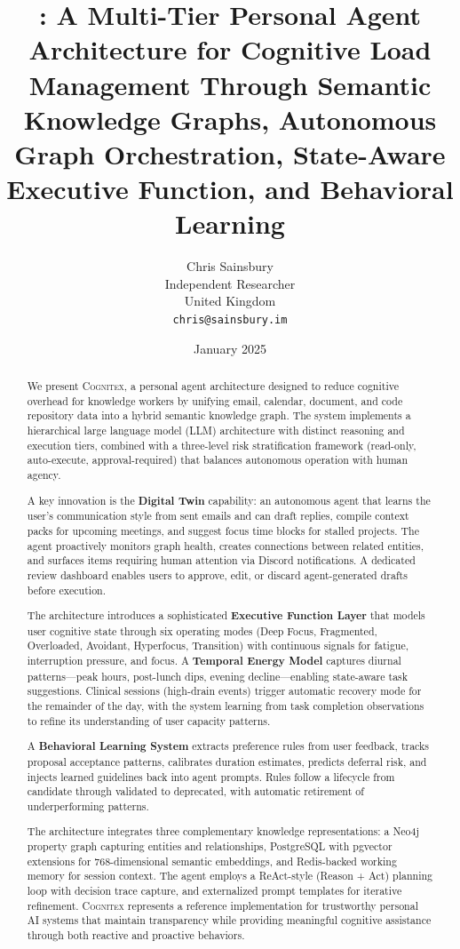 \documentclass[11pt,a4paper]{article}
\title{\cognitex{}: A Multi-Tier Personal Agent Architecture for Cognitive Load Management Through Semantic Knowledge Graphs, Autonomous Graph Orchestration, State-Aware Executive Function, and Behavioral Learning}
\author{
    Chris Sainsbury\\
    Independent Researcher\\
    United Kingdom\\
    \texttt{chris@sainsbury.im}
}
\date{January 2025}
\newcommand{\cognitex}{\textsc{Cognitex}}
\begin{document}
\maketitle

\begin{abstract}
We present \cognitex{}, a personal agent architecture designed to reduce cognitive overhead for knowledge workers by unifying email, calendar, document, and code repository data into a hybrid semantic knowledge graph. The system implements a hierarchical large language model (LLM) architecture with distinct reasoning and execution tiers, combined with a three-level risk stratification framework (read-only, auto-execute, approval-required) that balances autonomous operation with human agency.

A key innovation is the \textbf{Digital Twin} capability: an autonomous agent that learns the user's communication style from sent emails and can draft replies, compile context packs for upcoming meetings, and suggest focus time blocks for stalled projects. The agent proactively monitors graph health, creates connections between related entities, and surfaces items requiring human attention via Discord notifications. A dedicated review dashboard enables users to approve, edit, or discard agent-generated drafts before execution.

The architecture introduces a sophisticated \textbf{Executive Function Layer} that models user cognitive state through six operating modes (Deep Focus, Fragmented, Overloaded, Avoidant, Hyperfocus, Transition) with continuous signals for fatigue, interruption pressure, and focus. A \textbf{Temporal Energy Model} captures diurnal patterns---peak hours, post-lunch dips, evening decline---enabling state-aware task suggestions. Clinical sessions (high-drain events) trigger automatic recovery mode for the remainder of the day, with the system learning from task completion observations to refine its understanding of user capacity patterns.

A \textbf{Behavioral Learning System} extracts preference rules from user feedback, tracks proposal acceptance patterns, calibrates duration estimates, predicts deferral risk, and injects learned guidelines back into agent prompts. Rules follow a lifecycle from candidate through validated to deprecated, with automatic retirement of underperforming patterns.

The architecture integrates three complementary knowledge representations: a Neo4j property graph capturing entities and relationships, PostgreSQL with pgvector extensions for 768-dimensional semantic embeddings, and Redis-backed working memory for session context. The agent employs a ReAct-style (Reason + Act) planning loop with decision trace capture, and externalized prompt templates for iterative refinement. \cognitex{} represents a reference implementation for trustworthy personal AI systems that maintain transparency while providing meaningful cognitive assistance through both reactive and proactive behaviors.
\end{abstract}
\end{document}
